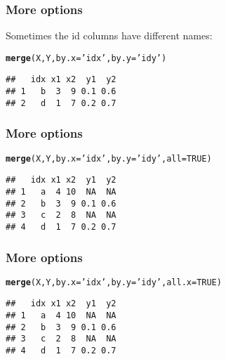\documentclass[12pt]{beamer}\usepackage[]{graphicx}\usepackage[]{color}
\makeatletter
\newcommand{\hlnum}[1]{\textcolor[rgb]{0.686,0.059,0.569}{#1}}%
\newcommand{\hlstr}[1]{\textcolor[rgb]{0.192,0.494,0.8}{#1}}%
\newcommand{\hlstd}[1]{\textcolor[rgb]{0.345,0.345,0.345}{#1}}%
\newcommand{\hlkwc}[1]{\textcolor[rgb]{0.333,0.667,0.333}{#1}}%
\newcommand{\hlkwd}[1]{\textcolor[rgb]{0.737,0.353,0.396}{\textbf{#1}}}%
\newenvironment{kframe}{%
 \def\at@end@of@kframe{}%
 \ifinner\ifhmode%
  \def\at@end@of@kframe{\end{minipage}}%
  \begin{minipage}{\columnwidth}%
 \fi\fi%
 \def\FrameCommand##1{\hskip\@totalleftmargin \hskip-\fboxsep
 \colorbox{shadecolor}{##1}\hskip-\fboxsep
     \hskip-\linewidth \hskip-\@totalleftmargin \hskip\columnwidth}%
 \MakeFramed {\advance\hsize-\width
   \@totalleftmargin\z@ \linewidth\hsize
   \@setminipage}}%
 {\par\unskip\endMakeFramed%
 \at@end@of@kframe}
\newenvironment{knitrout}{}{} %
\makeatother
\begin{document}
\begin{frame}[fragile]
\frametitle{More  options}

Sometimes the id columns have different names:
\begin{knitrout}\footnotesize
{}\color{fgcolor}\begin{kframe}
\begin{alltt}
\hlkwd{merge}\hlstd{(X, Y,} \hlkwc{by.x} \hlstd{=} \hlstr{'idx'}\hlstd{,} \hlkwc{by.y} \hlstd{=} \hlstr{'idy'}\hlstd{)}
\end{alltt}
\begin{verbatim}
##   idx x1 x2  y1  y2
## 1   b  3  9 0.1 0.6
## 2   d  1  7 0.2 0.7
\end{verbatim}
\end{kframe}
\end{knitrout}

\end{frame}


\begin{frame}[fragile]
\frametitle{More  options}

\begin{knitrout}\footnotesize
{}\color{fgcolor}\begin{kframe}
\begin{alltt}
\hlkwd{merge}\hlstd{(X, Y,} \hlkwc{by.x} \hlstd{=} \hlstr{'idx'}\hlstd{,} \hlkwc{by.y} \hlstd{=} \hlstr{'idy'}\hlstd{,} \hlkwc{all} \hlstd{=} \hlnum{TRUE}\hlstd{)}
\end{alltt}
\begin{verbatim}
##   idx x1 x2  y1  y2
## 1   a  4 10  NA  NA
## 2   b  3  9 0.1 0.6
## 3   c  2  8  NA  NA
## 4   d  1  7 0.2 0.7
\end{verbatim}
\end{kframe}
\end{knitrout}

\end{frame}


\begin{frame}[fragile]
\frametitle{More  options}

\begin{knitrout}\footnotesize
{}\color{fgcolor}\begin{kframe}
\begin{alltt}
\hlkwd{merge}\hlstd{(X, Y,} \hlkwc{by.x} \hlstd{=} \hlstr{'idx'}\hlstd{,} \hlkwc{by.y} \hlstd{=} \hlstr{'idy'}\hlstd{,} \hlkwc{all.x} \hlstd{=} \hlnum{TRUE}\hlstd{)}
\end{alltt}
\begin{verbatim}
##   idx x1 x2  y1  y2
## 1   a  4 10  NA  NA
## 2   b  3  9 0.1 0.6
## 3   c  2  8  NA  NA
## 4   d  1  7 0.2 0.7
\end{verbatim}
\end{kframe}
\end{knitrout}

\end{frame}
\end{document}
